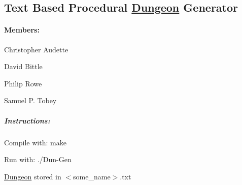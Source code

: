 \subsection*{Text Based Procedural \hyperlink{classDungeon}{Dungeon} Generator}

\paragraph*{Members\+:}


\begin{DoxyItemize}
\item Christopher Audette
\item David Bittle
\item Philip Rowe
\item Samuel P. Tobey
\end{DoxyItemize}

\subparagraph*{Instructions\+:}


\begin{DoxyItemize}
\item Compile with\+: make
\item Run with\+: ./\+Dun-\/\+Gen
\item \hyperlink{classDungeon}{Dungeon} stored in $<$some\+\_\+name$>$.txt 
\end{DoxyItemize}